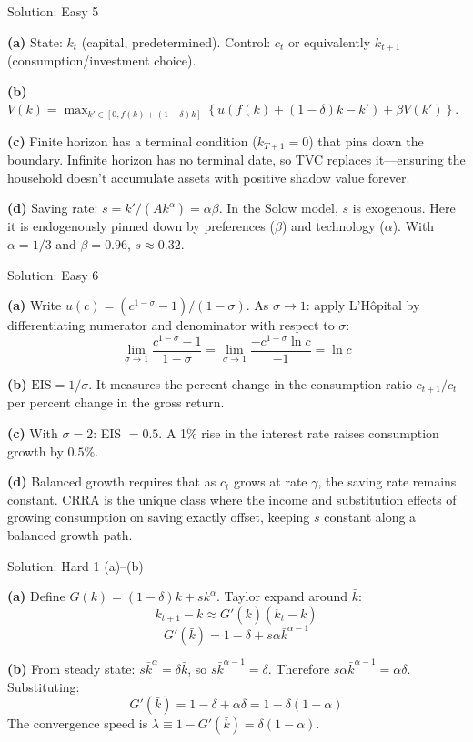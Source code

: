\documentclass[aspectratio=169,10pt]{beamer}
\newcommand{\backbutton}[1]{\hfill\hyperlink{#1}{\beamerbutton{Back}}}
\begin{document}
\begin{frame}{Solution: Easy 5}
\hypertarget{s-e5}{}

\textbf{(a)} State: $k_t$ (capital, predetermined). Control: $c_t$ or equivalently $k_{t+1}$ (consumption/investment choice).

\medskip
\textbf{(b)} $V(k) = \max_{k' \in [0, f(k)+(1-\delta)k]} \left\{u(f(k)+(1-\delta)k - k') + \beta V(k')\right\}$.

\medskip
\textbf{(c)} Finite horizon has a terminal condition ($k_{T+1}=0$) that pins down the boundary. Infinite horizon has no terminal date, so TVC replaces it---ensuring the household doesn't accumulate assets with positive shadow value forever.

\medskip
\textbf{(d)} Saving rate: $s = k'/(Ak^\alpha) = \alpha\beta$. In the Solow model, $s$ is exogenous. Here it is endogenously pinned down by preferences ($\beta$) and technology ($\alpha$). With $\alpha=1/3$ and $\beta=0.96$, $s \approx 0.32$.
\backbutton{q-e5}
\end{frame}

\begin{frame}{Solution: Easy 6}
\hypertarget{s-e6}{}

\textbf{(a)} Write $u(c)=(c^{1-\sigma}-1)/(1-\sigma)$. As $\sigma\to 1$: apply L'H\^{o}pital by differentiating numerator and denominator with respect to $\sigma$:
\[
\lim_{\sigma\to 1}\frac{c^{1-\sigma}-1}{1-\sigma} = \lim_{\sigma\to 1}\frac{-c^{1-\sigma}\ln c}{-1} = \ln c
\]

\textbf{(b)} $\text{EIS} = 1/\sigma$. It measures the percent change in the consumption ratio $c_{t+1}/c_t$ per percent change in the gross return.

\medskip
\textbf{(c)} With $\sigma=2$: EIS $= 0.5$. A 1\% rise in the interest rate raises consumption growth by $0.5\%$.

\medskip
\textbf{(d)} Balanced growth requires that as $c_t$ grows at rate $\gamma$, the saving rate remains constant. CRRA is the unique class where the income and substitution effects of growing consumption on saving exactly offset, keeping $s$ constant along a balanced growth path.
\backbutton{q-e6}
\end{frame}

\begin{frame}{Solution: Hard 1 (a)--(b)}
\hypertarget{s-h1}{}

\textbf{(a)} Define $G(k) = (1-\delta)k + sk^\alpha$. Taylor expand around $\bar{k}$:
\[
k_{t+1} - \bar{k} \approx G'(\bar{k})(k_t - \bar{k})
\]
\[
G'(\bar{k}) = 1 - \delta + s\alpha\bar{k}^{\alpha-1}
\]

\textbf{(b)} From steady state: $s\bar{k}^\alpha = \delta\bar{k}$, so $s\bar{k}^{\alpha-1} = \delta$. Therefore $s\alpha\bar{k}^{\alpha-1} = \alpha\delta$. Substituting:
\[
G'(\bar{k}) = 1 - \delta + \alpha\delta = 1 - \delta(1-\alpha)
\]
The convergence speed is $\lambda \equiv 1 - G'(\bar{k}) = \delta(1-\alpha)$.
\end{frame}
\end{document}

